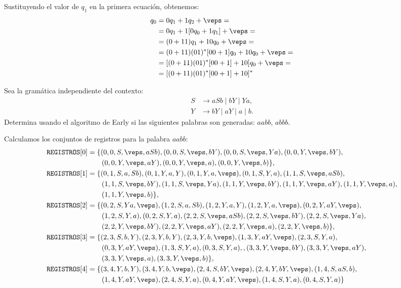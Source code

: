 \documentclass[12pt]{article}
\begin{document}
\begin{ejercicio}[2.5 puntos]
        Sustituyendo el valor de $q_1$ en la primera ecuación, obtenemos:
        \begin{align*}
            q_0 &= 0q_1 + 1q_2 + \veps
            =\\&= 0q_1 + 1[0q_0 + 1q_1] + \veps
            =\\&= (0+11)q_1 + 10q_0 + \veps
            =\\&= (0+11)(01)^*[00+1]q_0 + 10q_0 + \veps
            =\\&= [(0+11)(01)^*[00+1] + 10]q_0 + \veps
            =\\&= [(0+11)(01)^*[00+1] + 10]^*
        \end{align*}
    \end{ejercicio}

    \begin{ejercicio}[2.5 puntos]
        Sea la gramática independiente del contexto:
        \[
            \begin{aligned}
                S &\to aSb \mid bY \mid Ya, \\
                Y &\to bY \mid aY \mid a \mid b.
            \end{aligned}
        \]
        Determina usando el algoritmo de Early si las siguientes palabras son generadas: $aabb$, $abbb$.

        Calculamos los conjuntos de registros para la palabra $aabb$:
        \begin{align*}
            \texttt{REGISTROS}[0] &= \{(0,0,S,\veps,aSb),(0,0,S,\veps,bY),(0,0,S,\veps,Ya), (0,0,Y,\veps,bY),\\&\qquad (0,0,Y,\veps,aY),(0,0,Y,\veps,a),(0,0,Y,\veps,b)\}, \\
            \texttt{REGISTROS}[1] &= \{(0,1,S,a,Sb),(0,1,Y,a,Y), (0,1,Y,a,\veps),(0,1,S,Y,a),(1,1,S,\veps,aSb),\\&\qquad (1,1,S,\veps,bY),(1,1,S,\veps,Ya),(1,1,Y,\veps,bY),(1,1,Y,\veps,aY),(1,1,Y,\veps,a),\\&\qquad (1,1,Y,\veps,b)\}, \\
            \texttt{REGISTROS}[2] &= \{(0,2,S,Ya,\veps),(1,2,S,a,Sb),(1,2,Y,a,Y),(1,2,Y,a,\veps),(0,2,Y,aY,\veps),\\&\qquad(1,2,S,Y,a),(0,2,S,Y,a),(2,2,S,\veps,aSb),(2,2,S,\veps,bY),(2,2,S,\veps,Ya),\\&\qquad(2,2,Y,\veps,bY),(2,2,Y,\veps,aY),(2,2,Y,\veps,a),(2,2,Y,\veps,b)\}, \\
            \texttt{REGISTROS}[3] &= \{(2,3,S,b,Y), (2,3,Y,b,Y), (2,3,Y,b,\veps),(1,3,Y,aY,\veps),(2,3,S,Y,a),\\&\qquad(0,3,Y,aY,\veps),(1,3,S,Y,a),(0,3,S,Y,a),,(3,3,Y,\veps,bY),(3,3,Y,\veps,aY),\\&\qquad(3,3,Y,\veps,a),(3,3,Y,\veps,b)\}, \\
            \texttt{REGISTROS}[4] &= \{(3,4,Y,b,Y), (3,4,Y,b,\veps),(2,4,S,bY,\veps),(2,4,Y,bY,\veps),(1,4,S,aS,b),\\&\qquad(1,4,Y,aY,\veps),(2,4,S,Y,a),(0,4,Y,aY,\veps),(1,4,S,Y,a),(0,4,S,Y,a)\}
        \end{align*}


\end{ejercicio}
\end{document}
